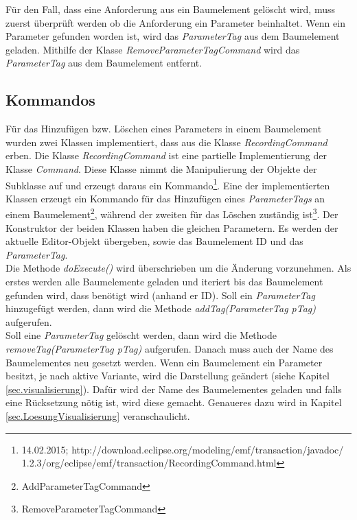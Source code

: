 Für den Fall, dass eine Anforderung aus ein Baumelement gelöscht wird, muss zuerst überprüft werden ob die Anforderung ein Parameter beinhaltet. Wenn ein Parameter gefunden worden ist, wird das \textit{ParameterTag} aus dem Baumelement geladen. Mithilfe der Klasse \textit{RemoveParameterTagCommand} wird das \textit{ParameterTag} aus dem Baumelement entfernt.

\subsection{Kommandos}\label{sub.Command}
Für das Hinzufügen bzw. Löschen eines Parameters in einem Baumelement wurden zwei Klassen implementiert, dass aus die Klasse \textit{RecordingCommand} erben. Die Klasse \textit{RecordingCommand} ist eine partielle Implementierung der Klasse \textit{Command}. Diese Klasse nimmt die  Manipulierung der Objekte der Subklasse auf und erzeugt daraus ein Kommando\footnote{14.02.2015; http://download.eclipse.org/modeling/emf/transaction/javadoc/ 1.2.3/org/eclipse/emf/transaction/RecordingCommand.html}. Eine der implementierten Klassen erzeugt ein Kommando für das Hinzufügen eines \textit{ParameterTags} an einem Baumelement\footnote{AddParameterTagCommand}, während der zweiten für das Löschen zuständig ist\footnote{RemoveParameterTagCommand}. Der Konstruktor der beiden Klassen haben die gleichen Parametern. Es werden der aktuelle Editor-Objekt übergeben, sowie das Baumelement ID und das \textit{ParameterTag}.\\


Die Methode \textit{doExecute()} wird überschrieben um die Änderung vorzunehmen. Als erstes werden alle Baumelemente geladen und iteriert bis das Baumelement gefunden wird, dass benötigt wird (anhand er ID). Soll ein \textit{ParameterTag} hinzugefügt werden, dann wird die Methode \textit{addTag(ParameterTag pTag)} aufgerufen.\\


Soll eine \textit{ParameterTag} gelöscht werden, dann wird die Methode \textit{removeTag(ParameterTag pTag)} aufgerufen. Danach muss auch der Name des Baumelementes neu gesetzt werden. Wenn ein Baumelement ein Parameter besitzt, je nach aktive Variante, wird die Darstellung geändert (siehe Kapitel \ref{sec.visualisierung}). Dafür wird der Name des Baumelementes geladen und falls eine Rücksetzung nötig ist, wird diese gemacht. Genaueres dazu wird in Kapitel \ref{sec.LoesungVisualisierung} veranschaulicht.\\

